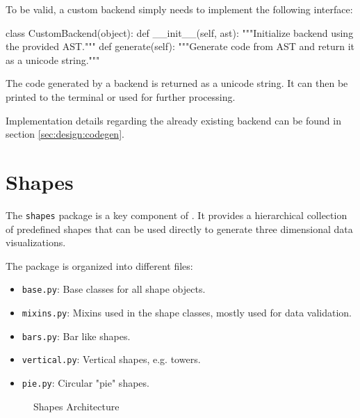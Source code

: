 To be valid, a custom backend simply needs to implement the following interface:

\vspace{.5\baselineskip}
\begin{pythoncode}
class CustomBackend(object):
    def __init__(self, ast):
        """Initialize backend using the provided AST."""
    def generate(self):
        """Generate code from AST and return it
        as a unicode string."""
\end{pythoncode}

\noindent The code generated by a backend is returned as a unicode string. It
can then be printed to the terminal or used for further processing.

Implementation details regarding the already existing backend can be found in
section \ref{sec:design:codegen}.


\section{Shapes}\label{sec:architecture:shapes}

The \texttt{shapes} package is a key component of \tangible{}. It provides a
hierarchical collection of predefined shapes that can be used directly to
generate three dimensional data visualizations.

\vspace{.5\baselineskip}

\noindent The package is organized into different files:

\begin{itemize}
	\item \texttt{base.py}: Base classes for all shape objects.
	\item \texttt{mixins.py}: Mixins used in the shape classes, mostly used for
		data validation.
	\item \texttt{bars.py}: Bar like shapes.
	\item \texttt{vertical.py}: Vertical shapes, e.g. towers.
	\item \texttt{pie.py}: Circular "pie" shapes.
\end{itemize}

\begin{figure}[H]
	\centering
	
	\caption{Shapes Architecture}
	\label{img:shapes}
\end{figure}


